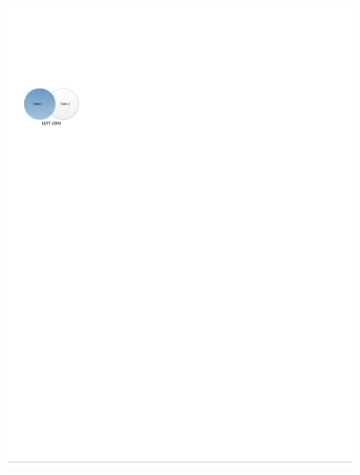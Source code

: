 \begin{figure}[H]
\centering
  \begin{subfigure}[c]{0.3\textwidth}\centering
  \includegraphics[width=\textwidth]{figures/sql/left_join}
  \label{fig:sql:joins:left_join}
  \end{subfigure}
  ~
  \begin{subfigure}[c]{0.3\textwidth}\centering

\end{subfigure}
\end{figure}
